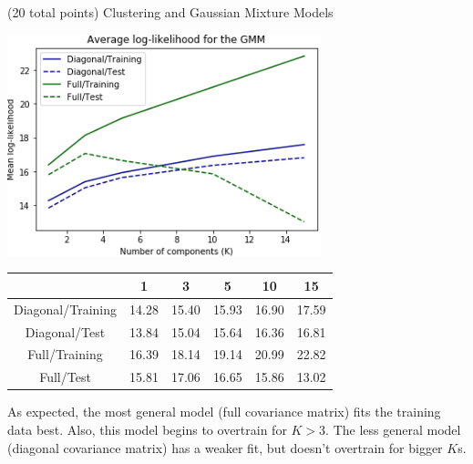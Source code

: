 \documentclass[12pt]{article}
\begin{document}
\begin{question}{(20 total points) Clustering and Gaussian Mixture Models}
\begin{subquestion}
      \begin{answerbox}{30em}
            \begin{center}
			\includegraphics[width=0.68\textwidth]{imgs/3_5.png}
			\begin{tabular}{|c|c|c|c|c|c|}

			\hline 
 & 1 & 3 & 5 & 10 & 15\\ \hline
Diagonal/Training & 14.28 & 15.40 & 15.93 & 16.90 & 17.59 \\ \hline
Diagonal/Test & 13.84 & 15.04 & 15.64 & 16.36 & 16.81 \\ \hline
Full/Training & 16.39 & 18.14 & 19.14 & 20.99 & 22.82 \\ \hline
Full/Test & 15.81 & 17.06 & 16.65 & 15.86 & 13.02 \\ \hline

			\end{tabular} 
		\end{center}
	As expected, the most general model (full covariance matrix) fits the training data best. Also, this model begins to overtrain for $K>3$. The less general model (diagonal covariance matrix) has a weaker fit, but doesn't overtrain for bigger $K$s.

      \end{answerbox}
  


   \end{subquestion}

   
\end{question}
\end{document}
